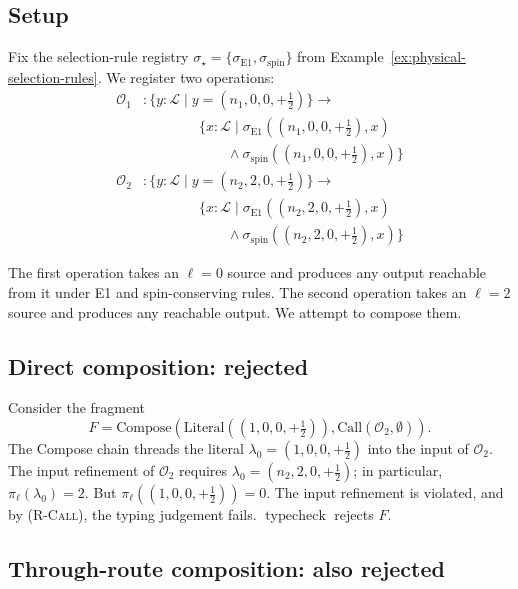 \documentclass[twocolumn,11pt,a4paper]{article}
\DeclareMathOperator{\typecheck}{typecheck}
\newcommand{\Lab}{\mathcal{L}}
\newcommand{\Sel}{\sigma}
\newcommand{\Frag}{F}
\newcommand{\Op}{\mathcal{O}}
\newcommand{\rul}[1]{\textsc{(#1)}}
\newcommand{\vCall}[2]{\mathrm{Call}(#1,#2)}
\newcommand{\vComp}[1]{\mathrm{Compose}(#1)}
\newcommand{\vLit}[1]{\mathrm{Literal}(#1)}
\begin{document}
\subsection{Setup}

Fix the selection-rule registry $\Sel_\star = \{\Sel_{\mathrm{E1}}, \Sel_{\mathrm{spin}}\}$ from Example~\ref{ex:physical-selection-rules}. We register two operations:
\begin{align*}
\Op_1 &: \{y : \Lab \mid y = (n_1, 0, 0, +\tfrac{1}{2})\} \to \\
      &\hspace{4em} \{x : \Lab \mid \Sel_{\mathrm{E1}}((n_1, 0, 0, +\tfrac{1}{2}), x) \\
      &\hspace{6em} \wedge \Sel_{\mathrm{spin}}((n_1, 0, 0, +\tfrac{1}{2}), x)\}\\
\Op_2 &: \{y : \Lab \mid y = (n_2, 2, 0, +\tfrac{1}{2})\} \to \\
      &\hspace{4em} \{x : \Lab \mid \Sel_{\mathrm{E1}}((n_2, 2, 0, +\tfrac{1}{2}), x) \\
      &\hspace{6em} \wedge \Sel_{\mathrm{spin}}((n_2, 2, 0, +\tfrac{1}{2}), x)\}
\end{align*}

The first operation takes an $\ell = 0$ source and produces any output reachable from it under E1 and spin-conserving rules. The second operation takes an $\ell = 2$ source and produces any reachable output. We attempt to compose them.

\subsection{Direct composition: rejected}

Consider the fragment
\[
\Frag = \vComp{\vLit{(1, 0, 0, +\tfrac{1}{2})}, \vCall{\Op_2}{\emptyset}}.
\]
The Compose chain threads the literal $\lambda_0 = (1, 0, 0, +\tfrac{1}{2})$ into the input of $\Op_2$. The input refinement of $\Op_2$ requires $\lambda_0 = (n_2, 2, 0, +\tfrac{1}{2})$; in particular, $\pi_\ell(\lambda_0) = 2$. But $\pi_\ell((1, 0, 0, +\tfrac{1}{2})) = 0$. The input refinement is violated, and by \rul{R-Call}, the typing judgement fails. $\typecheck$ rejects $\Frag$.

\subsection{Through-route composition: also rejected}
\end{document}
